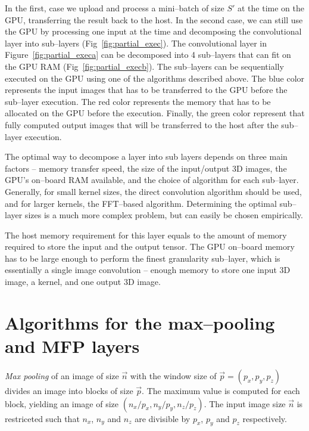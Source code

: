 \documentclass[conference]{IEEEtran}
\begin{document}
  In the first, case we upload and process a mini--batch of size $S'$
  at the time on the GPU, transferring the result back to the host.
  In the second case, we can still use the GPU by processing one input
  at the time and decomposing the convolutional layer into sub--layers
  (Fig~\ref{fig:partial_exec}). The convolutional layer in
  Figure~\ref{fig:partial_execa} can be decomposed into 4 sub--layers
  that can fit on the GPU RAM (Fig~\ref{fig:partial_execb}). The
  sub--layers can be sequentially executed on the GPU using one of the
  algorithms described above.  The blue color represents the input
  images that has to be transferred to the GPU before the sub--layer
  execution.  The red color represents the memory that has to be
  allocated on the GPU before the execution.  Finally, the green color
  represent that fully computed output images that will be transferred
  to the host after the sub--layer execution.

  The optimal way to decompose a layer into sub layers depends on
  three main factors -- memory transfer speed, the size of the
  input/output 3D images, the GPU's on--board RAM available, and the
  choice of algorithm for each sub--layer.  Generally, for small
  kernel sizes, the direct convolution algorithm should be used, and
  for larger kernels, the FFT--based algorithm.  Determining the
  optimal sub--layer sizes is a much more complex problem, but can
  easily be chosen empirically.

  The host memory requirement for this layer equals to the amount of
  memory required to store the input and the output tensor.  The GPU
  on--board memory has to be large enough to perform the finest
  granularity sub--layer, which is essentially a single image
  convolution -- enough memory to store one input 3D image, a kernel,
  and one output 3D image.

\section{Algorithms for the max--pooling and MFP layers}

  \emph{Max pooling} of an image of size $\vec{n}$ with the window
  size of $\vec{p} = (p_x,p_y,p_z)$ divides an image into blocks of
  size $\vec{p}$.  The maximum value is computed for each block,
  yielding an image of size $(n_x/p_x,n_y/p_y,n_z/p_z)$.  The input
  image size $\vec{n}$ is restriceted such that $n_x$, $n_y$ and $n_z$
  are divisible by $p_x$, $p_y$ and $p_z$ respectively.
\end{document}
